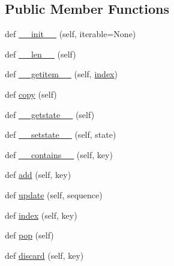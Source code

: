 \subsection*{Public Member Functions}
\begin{DoxyCompactItemize}
\item 
def \hyperlink{classsetuptools_1_1__vendor_1_1ordered__set_1_1OrderedSet_a6449b2239a895bbf87203d5f23dc2548}{\+\_\+\+\_\+init\+\_\+\+\_\+} (self, iterable=None)
\item 
def \hyperlink{classsetuptools_1_1__vendor_1_1ordered__set_1_1OrderedSet_a0e386977ecad62376c21292b091bdc6d}{\+\_\+\+\_\+len\+\_\+\+\_\+} (self)
\item 
def \hyperlink{classsetuptools_1_1__vendor_1_1ordered__set_1_1OrderedSet_afa5d263824cc35374a0cf762672f68ae}{\+\_\+\+\_\+getitem\+\_\+\+\_\+} (self, \hyperlink{classsetuptools_1_1__vendor_1_1ordered__set_1_1OrderedSet_a4c9cbb502c5f54f77e574032bf66f9d6}{index})
\item 
def \hyperlink{classsetuptools_1_1__vendor_1_1ordered__set_1_1OrderedSet_a84224c403039b9dac5d2794d85073053}{copy} (self)
\item 
def \hyperlink{classsetuptools_1_1__vendor_1_1ordered__set_1_1OrderedSet_ab9a88d5c860fe783c39fb66b8003351c}{\+\_\+\+\_\+getstate\+\_\+\+\_\+} (self)
\item 
def \hyperlink{classsetuptools_1_1__vendor_1_1ordered__set_1_1OrderedSet_a852740634ccd2e3158b599082cf086de}{\+\_\+\+\_\+setstate\+\_\+\+\_\+} (self, state)
\item 
def \hyperlink{classsetuptools_1_1__vendor_1_1ordered__set_1_1OrderedSet_a0f7bed867c4a02e3342a3ae452b59b07}{\+\_\+\+\_\+contains\+\_\+\+\_\+} (self, key)
\item 
def \hyperlink{classsetuptools_1_1__vendor_1_1ordered__set_1_1OrderedSet_af53bf94a4162a3a93f25d7ccbe8bb7a2}{add} (self, key)
\item 
def \hyperlink{classsetuptools_1_1__vendor_1_1ordered__set_1_1OrderedSet_a464866fb08988f25948761c50a438435}{update} (self, sequence)
\item 
def \hyperlink{classsetuptools_1_1__vendor_1_1ordered__set_1_1OrderedSet_a4c9cbb502c5f54f77e574032bf66f9d6}{index} (self, key)
\item 
def \hyperlink{classsetuptools_1_1__vendor_1_1ordered__set_1_1OrderedSet_a2c082ff6ec71d46b9bfc294323720611}{pop} (self)
\item 
def \hyperlink{classsetuptools_1_1__vendor_1_1ordered__set_1_1OrderedSet_aba1c2bb8144014dfad2f2d4872fe1337}{discard} (self, key)

\end{DoxyCompactItemize}
